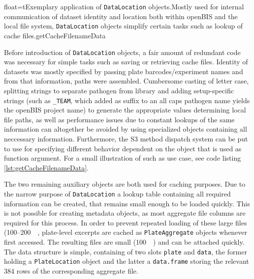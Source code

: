 \begin{rlisting}{float=t}{Exemplary application of \texttt{DataLocation} objects.}{Mostly used for internal communication of dataset identity and location both within openBIS and the local file system, \texttt{DataLocation} objects simplify certain tasks such as lookup of cache files.}{getCacheFilenameData}

\end{rlisting}

Before introduction of \texttt{DataLocation} objects, a fair amount of redundant code was necessary for simple tasks such as saving or retrieving cache files. Identity of datasets was mostly specified by passing plate barcodes\slash experiment names and from that information, paths were assembled. Cumbersome casting of letter case, splitting strings to separate pathogen from library and adding setup-specific strings (such as \texttt{_TEAM}, which added as suffix to an all caps pathogen name yields the openBIS project name) to generate the appropriate values determining local file paths, as well as performance issues due to constant lookups of the same information can altogether be avoided by using specialized objects containing all neccessary information. Furthermore, the S3 method dispatch system can be put to use for specifying different behavior dependent on the object that is used as function argument. For a small illustration of such as use case, see code listing \ref{lst:getCacheFilenameData}.

The two remaining auxiliary objects are both used for caching purposes. Due to the narrow purpose of \texttt{DataLocation} a lookup table containing all required information can be created, that remains small enough to be loaded quickly. This is not possible for creating metadata objects, as most aggregate file columns are required for this process. In order to prevent repeated loading of these large files (100--\SI{200}{\mega\byte}, plate-level excerpts are cached as \texttt{PlateAggregate} objects whenever first accessed. The resulting files are small (\tilde \SI{100}{\kilo\byte}) and can be attached quickly. The data structure is simple, containing of two slots \texttt{plate} and \texttt{data}, the former holding a \texttt{PlateLocation} object and the latter a \texttt{data.frame} storing the relevant 384 rows of the corresponding aggregate file.

